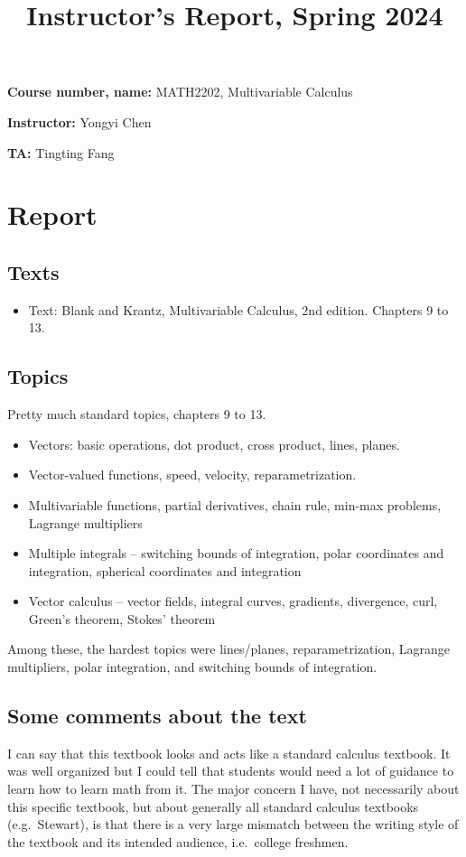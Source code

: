 \documentclass[11pt,oneside]{amsart}
\title{Instructor's Report, Spring 2024}
\begin{document}
\maketitle

\bigskip

\textbf{Course number, name:} MATH2202, Multivariable Calculus

\textbf{Instructor:} Yongyi Chen

\textbf{TA:} Tingting Fang

\section{Report}
\subsection{Texts}
\begin{itemize}
  \item Text: Blank and Krantz, Multivariable Calculus, 2nd edition. Chapters 9 to 13.
\end{itemize}

\subsection{Topics}
Pretty much standard topics, chapters 9 to 13.
\begin{itemize}
  \item Vectors: basic operations, dot product, cross product, lines, planes.
  \item Vector-valued functions, speed, velocity, reparametrization.
  \item Multivariable functions, partial derivatives, chain rule, min-max problems, Lagrange multipliers
  \item Multiple integrals -- switching bounds of integration, polar coordinates and integration, spherical coordinates and integration
  \item Vector calculus -- vector fields, integral curves, gradients, divergence, curl, Green's theorem, Stokes' theorem
\end{itemize}
Among these, the hardest topics were lines/planes, reparametrization, Lagrange multipliers, polar integration, and switching bounds of integration.

\subsection{Some comments about the text}
I can say that this textbook looks and acts like a standard calculus textbook. It was well organized but I could tell that students would need a lot of guidance to learn how to learn math from it. The major concern I have, not necessarily about this specific textbook, but about generally all standard calculus textbooks (e.g.\ Stewart), is that there is a very large mismatch between the writing style of the textbook and its intended audience, i.e.\ college freshmen.
\end{document}
